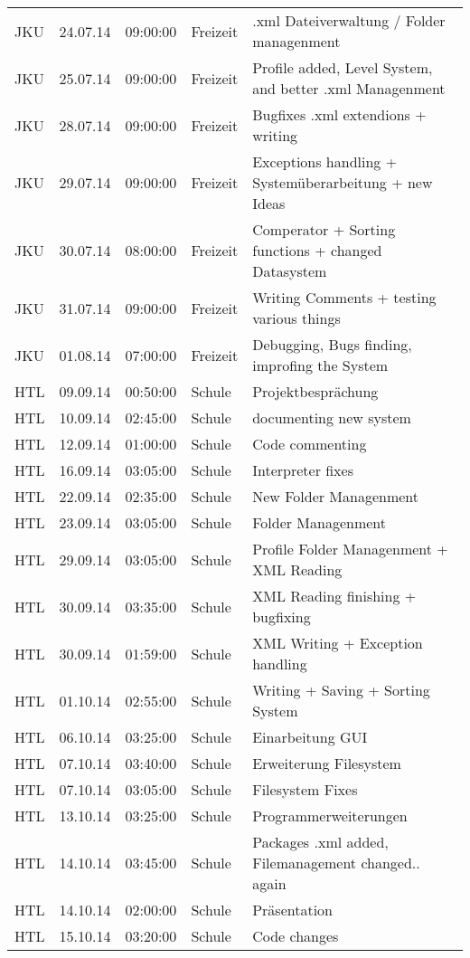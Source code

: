 \begin{small}
\begin{longtable}{ p{} p{} p{} p{} p{}}
JKU	& 24.07.14	& 09:00:00	& Freizeit	& .xml Dateiverwaltung / Folder managenment \\
JKU	& 25.07.14	& 09:00:00	& Freizeit	& Profile added, Level System, and better .xml Managenment \\
JKU	& 28.07.14	& 09:00:00	& Freizeit	& Bugfixes .xml extendions + writing \\
JKU	& 29.07.14	& 09:00:00	& Freizeit	& Exceptions handling + System\"uberarbeitung + new Ideas \\
JKU	& 30.07.14	& 08:00:00	& Freizeit	& Comperator + Sorting functions + changed Datasystem \\
JKU	& 31.07.14	& 09:00:00	& Freizeit	& Writing Comments + testing various things \\
JKU	& 01.08.14	& 07:00:00	& Freizeit	& Debugging, Bugs finding, improfing the System \\
HTL	& 09.09.14	& 00:50:00	& Schule	& Projektbespr\"achung  \\
HTL	& 10.09.14	& 02:45:00	& Schule	& documenting new system \\
HTL	& 12.09.14	& 01:00:00	& Schule	& Code commenting \\
HTL	& 16.09.14	& 03:05:00	& Schule	& Interpreter fixes \\
HTL	& 22.09.14	& 02:35:00	& Schule	& New Folder Managenment \\
HTL	& 23.09.14	& 03:05:00	& Schule	& Folder Managenment \\
HTL	& 29.09.14	& 03:05:00	& Schule	& Profile Folder Managenment + XML Reading \\
HTL	& 30.09.14	& 03:35:00	& Schule	& XML Reading finishing + bugfixing \\
HTL	& 30.09.14	& 01:59:00	& Schule	& XML Writing + Exception handling \\
HTL	& 01.10.14	& 02:55:00	& Schule	& Writing + Saving + Sorting System \\
HTL	& 06.10.14	& 03:25:00	& Schule	& Einarbeitung GUI \\
HTL	& 07.10.14	& 03:40:00	& Schule	& Erweiterung Filesystem \\
HTL	& 07.10.14	& 03:05:00	& Schule	& Filesystem Fixes \\
HTL	& 13.10.14	& 03:25:00	& Schule	& Programmerweiterungen \\
HTL	& 14.10.14	& 03:45:00	& Schule	& Packages .xml added, Filemanagement changed.. again \\
HTL	& 14.10.14	& 02:00:00	& Schule	& Pr\"asentation \\
HTL	& 15.10.14	& 03:20:00	& Schule	& Code changes \\

\end{longtable}
\end{small}
